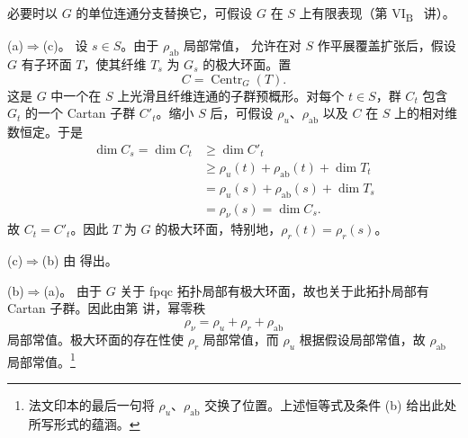 必要时以 \(G\) 的单位连通分支替换它，可假设 \(G\) 在 \(S\) 上有限表现（第 VI\textsubscript{B}~ 讲）。

\textup{(a)}\(\Rightarrow\)\textup{(c)}。
设 \(s\in S\)。由于 \(\rho_{\mathrm{ab}}\) 局部常值， 允许在对 \(S\) 作平展覆盖扩张后，假设 \(G\) 有子环面 \(T\)，使其纤维 \(T_s\) 为 \(G_s\) 的极大环面。置
\[
  C=\operatorname{Centr}_G(T).
\]
这是 \(G\) 中一个在 \(S\) 上光滑且纤维连通的子群预概形。对每个 \(t\in S\)，群 \(C_t\) 包含 \(G_t\) 的一个 Cartan 子群 \(C'_t\)。缩小 \(S\) 后，可假设 \(\rho_u\)、\(\rho_{\mathrm{ab}}\) 以及 \(C\) 在 \(S\) 上的相对维数恒定。于是
\[
\begin{aligned}
  \dim C_s=\dim C_t
  &\geq \dim C'_t\\
  &\geq \rho_u(t)+\rho_{\mathrm{ab}}(t)+\dim T_t\\
  &=\rho_u(s)+\rho_{\mathrm{ab}}(s)+\dim T_s\\
  &=\rho_\nu(s)=\dim C_s.
\end{aligned}
\]
故 \(C_t=C'_t\)。因此 \(T\) 为 \(G\) 的极大环面，特别地，\(\rho_r(t)=\rho_r(s)\)。

\textup{(c)}\(\Rightarrow\)\textup{(b)} 由 得出。

\textup{(b)}\(\Rightarrow\)\textup{(a)}。
由于 \(G\) 关于 fpqc 拓扑局部有极大环面，故也关于此拓扑局部有 Cartan 子群。因此由第  讲，幂零秩
\[
  \rho_\nu=\rho_u+\rho_r+\rho_{\mathrm{ab}}
\]
局部常值。极大环面的存在性使 \(\rho_r\) 局部常值，而 \(\rho_u\) 根据假设局部常值，故 \(\rho_{\mathrm{ab}}\) 局部常值。\footnote{法文印本的最后一句将 \(\rho_u\)、\(\rho_{\mathrm{ab}}\) 交换了位置。上述恒等式及条件 \textup{(b)} 给出此处所写形式的蕴涵。}
